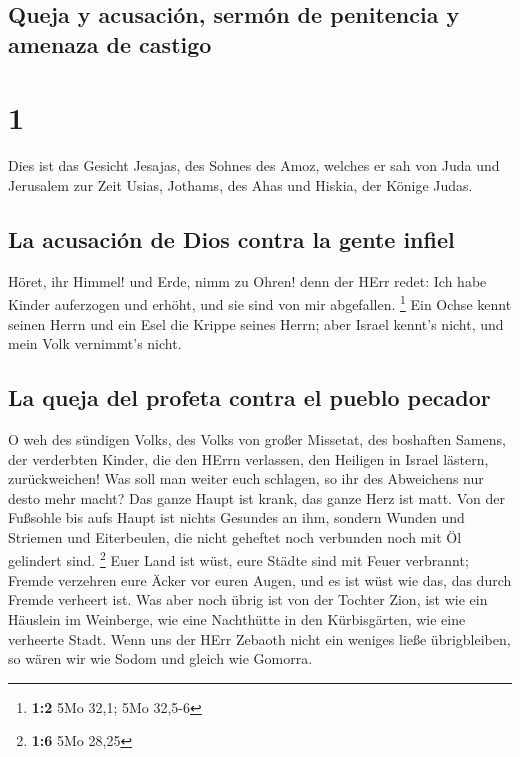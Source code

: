 \hypertarget{queja-y-acusaciuxf3n-sermuxf3n-de-penitencia-y-amenaza-de-castigo}{%
\subsection{Queja y acusación, sermón de penitencia y amenaza de
castigo}\label{queja-y-acusaciuxf3n-sermuxf3n-de-penitencia-y-amenaza-de-castigo}}

\hypertarget{section}{%
\section{1}\label{section}}

 Dies ist das Gesicht Jesajas, des Sohnes des Amoz,
welches er sah von Juda und Jerusalem zur Zeit Usias, Jothams, des Ahas
und Hiskia, der Könige Judas.

\hypertarget{la-acusaciuxf3n-de-dios-contra-la-gente-infiel}{%
\subsection{La acusación de Dios contra la gente
infiel}\label{la-acusaciuxf3n-de-dios-contra-la-gente-infiel}}

 Höret, ihr Himmel! und Erde, nimm zu Ohren! denn der HErr
redet: Ich habe Kinder auferzogen und erhöht, und sie sind von mir
abgefallen. \footnote{\textbf{1:2} 5Mo 32,1; 5Mo 32,5-6} 
Ein Ochse kennt seinen Herrn und ein Esel die Krippe seines Herrn; aber
Israel kennt's nicht, und mein Volk vernimmt's nicht.

\hypertarget{la-queja-del-profeta-contra-el-pueblo-pecador}{%
\subsection{La queja del profeta contra el pueblo
pecador}\label{la-queja-del-profeta-contra-el-pueblo-pecador}}

 O weh des sündigen Volks, des Volks von großer Missetat,
des boshaften Samens, der verderbten Kinder, die den HErrn verlassen,
den Heiligen in Israel lästern, zurückweichen!  Was soll
man weiter euch schlagen, so ihr des Abweichens nur desto mehr macht?
Das ganze Haupt ist krank, das ganze Herz ist matt.  Von
der Fußsohle bis aufs Haupt ist nichts Gesundes an ihm, sondern Wunden
und Striemen und Eiterbeulen, die nicht geheftet noch verbunden noch mit
Öl gelindert sind. \footnote{\textbf{1:6} 5Mo 28,25}  Euer
Land ist wüst, eure Städte sind mit Feuer verbrannt; Fremde verzehren
eure Äcker vor euren Augen, und es ist wüst wie das, das durch Fremde
verheert ist.  Was aber noch übrig ist von der Tochter
Zion, ist wie ein Häuslein im Weinberge, wie eine Nachthütte in den
Kürbisgärten, wie eine verheerte Stadt.  Wenn uns der HErr
Zebaoth nicht ein weniges ließe übrigbleiben, so wären wir wie Sodom und
gleich wie Gomorra.


